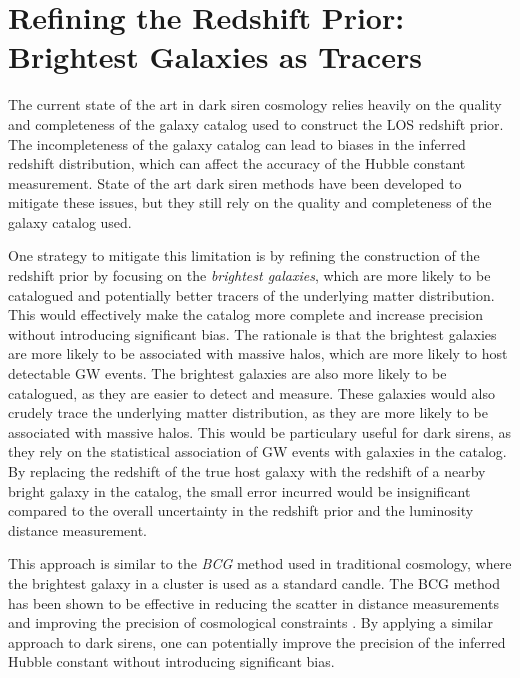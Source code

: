 \section{Refining the Redshift Prior: Brightest Galaxies as Tracers}
The current state of the art in dark siren cosmology relies heavily on the quality and completeness of the galaxy catalog used to construct the \ac{LOS} redshift prior. 
The incompleteness of the galaxy catalog can lead to biases in the inferred redshift distribution, which can affect the accuracy of the Hubble constant measurement. State of the art dark siren methods have been developed to mitigate these issues, but they still rely on the quality and completeness of the galaxy catalog used.

One strategy to mitigate this limitation is by refining the construction of the redshift prior by focusing on the \textit{brightest galaxies}, which are more likely to be catalogued and potentially better tracers of the underlying matter distribution. This would effectively make the catalog more complete and increase precision without introducing significant bias. The rationale is that the brightest galaxies are more likely to be associated with massive halos, which are more likely to host detectable \ac{GW} events. The brightest galaxies are also more likely to be catalogued, as they are easier to detect and measure. These galaxies would also crudely trace the underlying matter distribution, as they are more likely to be associated with massive halos. This would be particulary useful for dark sirens, as they rely on the statistical association of \ac{GW} events with galaxies in the catalog. By replacing the redshift of the true host galaxy with the redshift of a nearby bright galaxy in the catalog, the small error incurred would be insignificant compared to the overall uncertainty in the redshift prior and the luminosity distance measurement.

This approach is similar to the \textit{\ac{BCG}} method used in traditional cosmology, where the brightest galaxy in a cluster is used as a standard candle. The \ac{BCG} method has been shown to be effective in reducing the scatter in distance measurements and improving the precision of cosmological constraints \citep{lauer2014brightest}. By applying a similar approach to dark sirens, one can potentially improve the precision of the inferred Hubble constant without introducing significant bias.

